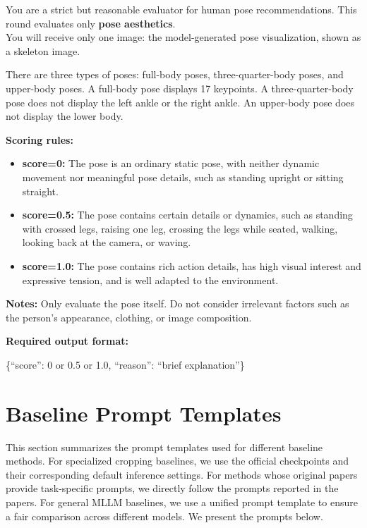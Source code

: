 \documentclass{article} %
\begin{document}
\begin{promptbox}
\small

You are a strict but reasonable evaluator for human pose recommendations. This round evaluates only \textbf{pose aesthetics}.\\

You will receive only one image: the model-generated pose visualization, shown as a skeleton image.

There are three types of poses: full-body poses, three-quarter-body poses, and upper-body poses. A full-body pose displays 17 keypoints. A three-quarter-body pose does not display the left ankle or the right ankle. An upper-body pose does not display the lower body.

\textbf{Scoring rules:}
\begin{itemize}
    \item \textbf{score=0:} The pose is an ordinary static pose, with neither dynamic movement nor meaningful pose details, such as standing upright or sitting straight.
    \item \textbf{score=0.5:} The pose contains certain details or dynamics, such as standing with crossed legs, raising one leg, crossing the legs while seated, walking, looking back at the camera, or waving.
    \item \textbf{score=1.0:} The pose contains rich action details, has high visual interest and expressive tension, and is well adapted to the environment.
\end{itemize}

\textbf{Notes:}
Only evaluate the pose itself. Do not consider irrelevant factors such as the person's appearance, clothing, or image composition.

\textbf{Required output format:}
\begin{flushleft}
\ttfamily\footnotesize
\{``score'': 0 or 0.5 or 1.0, ``reason'': ``brief explanation''\}
\end{flushleft}
\end{promptbox}

\section{Baseline Prompt Templates}
\label{app:baseline_prompt_templates}

This section summarizes the prompt templates used for different baseline methods. For specialized cropping baselines, we use the official checkpoints and their corresponding default inference settings. For methods whose original papers provide task-specific prompts, we directly follow the prompts reported in the papers. For general MLLM baselines, we use a unified prompt template to ensure a fair comparison across different models. We present the prompts below.
\end{document}
